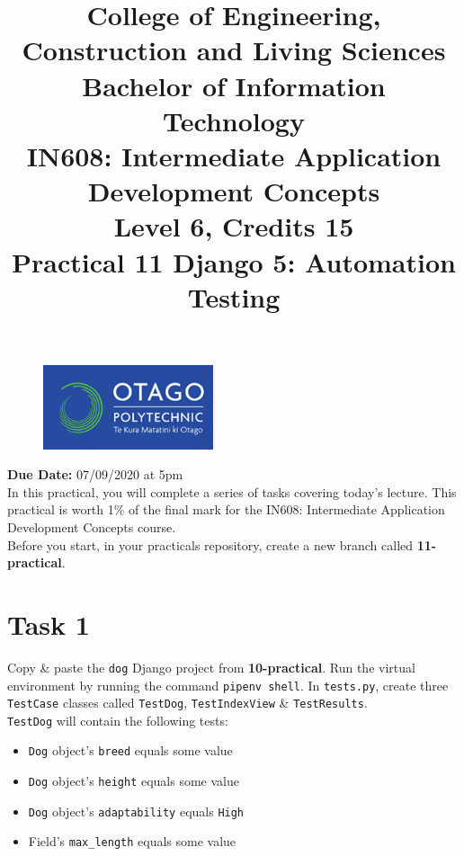 \documentclass{article}
\author{}
\begin{document}
\begin{figure}
	\centering
	\includegraphics[width=50mm]{./img/logo.png}
\end{figure}

\title{College of Engineering, Construction and Living Sciences\\Bachelor of Information Technology\\IN608: Intermediate Application Development Concepts\\Level 6, Credits 15\\\textbf{Practical 11 Django 5: Automation Testing}} 
\date{}
\maketitle

\textbf{Due Date:} 07/09/2020 at 5pm \\

In this practical, you will complete a series of tasks covering today's lecture. This practical is worth 1\% of the final mark for the IN608: Intermediate Application Development Concepts course. \\

Before you start, in your practicals repository, create a new branch called \textbf{11-practical}.

\section*{Task 1} 
Copy \& paste the \texttt{dog} Django project from \textbf{10-practical}. Run the virtual environment by running the command \texttt{pipenv shell}. In \texttt{tests.py}, create three \texttt{TestCase} classes called \texttt{TestDog}, \texttt{TestIndexView} \& \texttt{TestResults}.  \\

\texttt{TestDog} will contain the following tests:
\begin{itemize}
  \item \texttt{Dog} object's \texttt{breed} equals some value
  \item \texttt{Dog} object's \texttt{height} equals some value
  \item \texttt{Dog} object's \texttt{adaptability} equals \texttt{High}
  \item Field's \texttt{max\_length} equals some value
\end{itemize}
\end{document}
